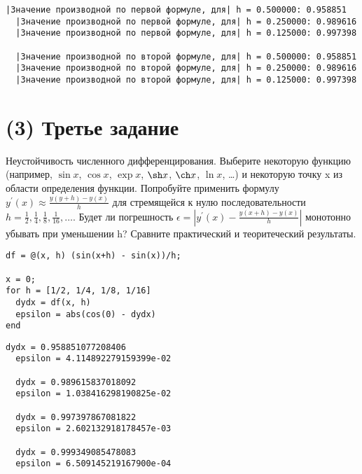 \begin{lstlisting}[backgroundcolor=\color{cyan}]
  |Значение производной по первой формуле, для| h = 0.500000: 0.958851
  |Значение производной по первой формуле, для| h = 0.250000: 0.989616
  |Значение производной по первой формуле, для| h = 0.125000: 0.997398

  |Значение производной по второй формуле, для| h = 0.500000: 0.958851
  |Значение производной по второй формуле, для| h = 0.250000: 0.989616
  |Значение производной по второй формуле, для| h = 0.125000: 0.997398
\end{lstlisting}

\section{(3) Третье задание}
Неустойчивость численного дифференцирования. Выберите некоторую функцию (например, $\sin x$, $\cos x$, $\exp x$, $\sh x$, $\ch x$, $\ln x$, \ldots) и некоторую точку x из области определения функции. Попробуйте применить формулу $y^{'}(x) \approx \frac{y(y+h) - y(x)}{h}$ для стремящейся к нулю последовательности $h = \frac{1}{2}, \frac{1}{4}, \frac{1}{8}, \frac{1}{16}, \ldots$. Будет ли погрешность $\epsilon = \left |y^{'}(x) - \frac{y(x+h) - y(x)}{h} \right |$ монотонно убывать при уменьшении h? Сравните практический и теоритеческий результаты.\\[5mm]

\begin{lstlisting}
df = @(x, h) (sin(x+h) - sin(x))/h;

x = 0;
for h = [1/2, 1/4, 1/8, 1/16]
  dydx = df(x, h)
  epsilon = abs(cos(0) - dydx)
end
\end{lstlisting}

\begin{lstlisting}[backgroundcolor=\color{cyan}]
  dydx = 0.958851077208406
  epsilon = 4.114892279159399e-02

  dydx = 0.989615837018092
  epsilon = 1.038416298190825e-02

  dydx = 0.997397867081822
  epsilon = 2.602132918178457e-03

  dydx = 0.999349085478083
  epsilon = 6.509145219167900e-04
\end{lstlisting}
